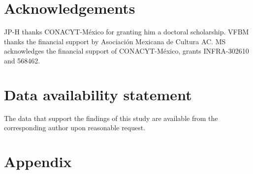 \documentclass[%
 preprint,
 aip, 
 amsmath,amssymb,
]{revtex4-2}
\begin{document}
	
\section*{Acknowledgements}

JP-H thanks CONACYT-México for granting him a doctoral scholarship. VFBM thanks the financial support by Asociación Mexicana de Cultura AC. MS acknowledges the financial support of CONACYT-México, grants INFRA-302610 and 568462. 

\section*{Data availability statement}

The data that support the findings of this study are available from the corresponding author upon reasonable request.
	
	
	\appendix
	
	\section*{Appendix}
\end{document}
